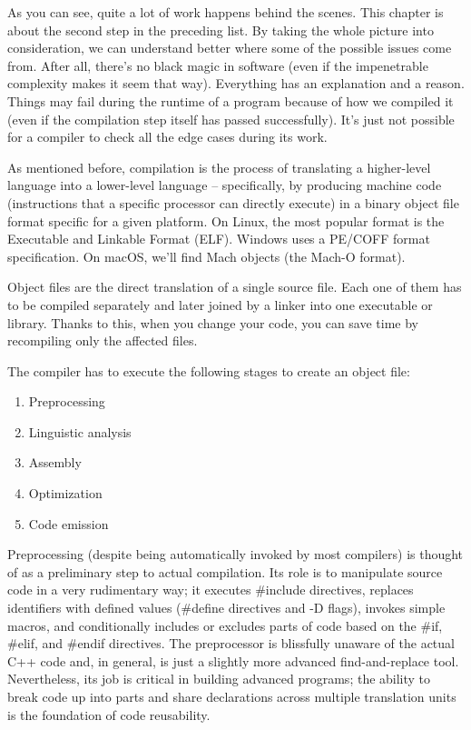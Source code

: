 As you can see, quite a lot of work happens behind the scenes. This chapter is about the second step in the preceding list. By taking the whole picture into consideration, we can understand better where some of the possible issues come from. After all, there's no black magic in software (even if the impenetrable complexity makes it seem that way). Everything has an explanation and a reason. Things may fail during the runtime of a program because of how we compiled it (even if the compilation step itself has passed successfully). It's just not possible for a compiler to check all the edge cases during its work.


As mentioned before, compilation is the process of translating a higher-level language into a lower-level language – specifically, by producing machine code (instructions that a specific processor can directly execute) in a binary object file format specific for a given platform. On Linux, the most popular format is the Executable and Linkable Format (ELF). Windows uses a PE/COFF format specification. On macOS, we'll find Mach objects (the Mach-O format).

Object files are the direct translation of a single source file. Each one of them has to be compiled separately and later joined by a linker into one executable or library. Thanks to this, when you change your code, you can save time by recompiling only the affected files.

The compiler has to execute the following stages to create an object file:

\begin{enumerate}
\item 
Preprocessing

\item 
Linguistic analysis

\item 
Assembly

\item 
Optimization

\item 
Code emission
\end{enumerate}

Preprocessing (despite being automatically invoked by most compilers) is thought of as a preliminary step to actual compilation. Its role is to manipulate source code in a very rudimentary way; it executes \#include directives, replaces identifiers with defined values (\#define directives and -D flags), invokes simple macros, and conditionally includes or excludes parts of code based on the \#if, \#elif, and \#endif directives. The preprocessor is blissfully unaware of the actual C++ code and, in general, is just a slightly more advanced find-and-replace tool. Nevertheless, its job is critical in building advanced programs; the ability to break code up into parts and share declarations across multiple translation units is the foundation of code reusability.

